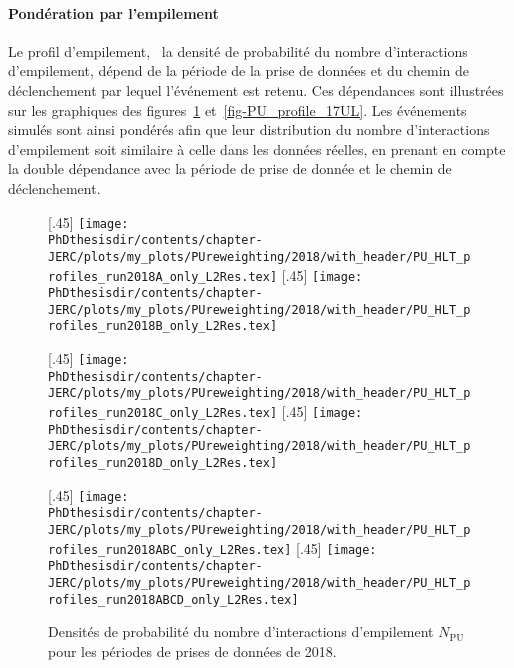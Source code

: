 \paragraph{Pondération par l'empilement}
Le profil d'empilement, \ie\ la densité de probabilité du nombre d'interactions d'empilement, dépend de la période de la prise de données et du chemin de déclenchement par lequel l'événement est retenu. Ces dépendances sont illustrées sur les graphiques des figures~\ref{fig-PU_profile_18} et~\ref{fig-PU_profile_17UL}.
Les événements simulés sont ainsi pondérés afin que leur distribution du nombre d'interactions d'empilement soit similaire à celle dans les données réelles, en prenant en compte la double dépendance avec la période de prise de donnée et le chemin de déclenchement.
\begin{figure}[p]
\centering
{}[.45\textwidth]
{\texttt{[image: \\PhDthesisdir/contents/chapter-JERC/plots/my\_plots/PUreweighting/2018/with\_header/PU\_HLT\_profiles\_run2018A\_only\_L2Res.tex]}}
\hfill
{}[.45\textwidth]
{\texttt{[image: \\PhDthesisdir/contents/chapter-JERC/plots/my\_plots/PUreweighting/2018/with\_header/PU\_HLT\_profiles\_run2018B\_only\_L2Res.tex]}}

\vfill

[.45\textwidth]
{\texttt{[image: \\PhDthesisdir/contents/chapter-JERC/plots/my\_plots/PUreweighting/2018/with\_header/PU\_HLT\_profiles\_run2018C\_only\_L2Res.tex]}}
\hfill
{}[.45\textwidth]
{\texttt{[image: \\PhDthesisdir/contents/chapter-JERC/plots/my\_plots/PUreweighting/2018/with\_header/PU\_HLT\_profiles\_run2018D\_only\_L2Res.tex]}}

\vfill

[.45\textwidth]
{\texttt{[image: \\PhDthesisdir/contents/chapter-JERC/plots/my\_plots/PUreweighting/2018/with\_header/PU\_HLT\_profiles\_run2018ABC\_only\_L2Res.tex]}}
\hfill
{}[.45\textwidth]
{\texttt{[image: \\PhDthesisdir/contents/chapter-JERC/plots/my\_plots/PUreweighting/2018/with\_header/PU\_HLT\_profiles\_run2018ABCD\_only\_L2Res.tex]}}

\caption[Densités de probabilité de $N_\text{PU}$ pour 2018.]{Densités de probabilité du nombre d'interactions d'empilement $N_\text{PU}$ pour les périodes de prises de données de 2018.}
\label{fig-PU_profile_18}
\end{figure}
